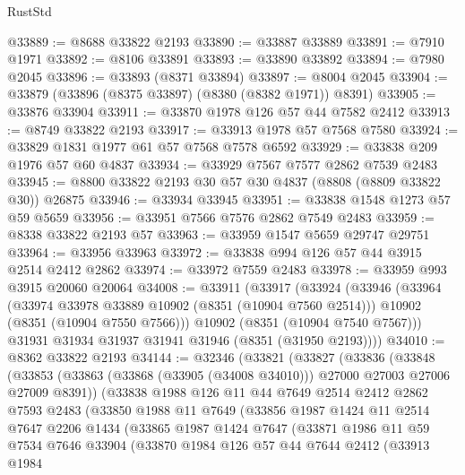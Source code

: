\begin{lexlean}{RustStd}
\begin{coremodule}
@33889 := @8688 @33822 @2193
@33890 := @33887 @33889
@33891 := @7910 @1971
@33892 := @8106 @33891
@33893 := @33890 @33892
@33894 := @7980 @2045
@33896 := @33893 (@8371 @33894)
@33897 := @8004 @2045
@33904 := @33879 (@33896 (@8375 @33897) (@8380 (@8382 @1971)) @8391)
@33905 := @33876 @33904
@33911 := @33870 @1978 @126 @57 @44 @7582 @2412
@33913 := @8749 @33822 @2193
@33917 := @33913 @1978 @57 @7568 @7580
@33924 := @33829 @1831 @1977 @61 @57 @7568 @7578 @6592
@33929 := @33838 @209 @1976 @57 @60 @4837
@33934 := @33929 @7567 @7577 @2862 @7539 @2483
@33945 := @8800 @33822 @2193 @30 @57 @30 @4837 (@8808 (@8809 @33822 @30)) @26875
@33946 := @33934 @33945
@33951 := @33838 @1548 @1273 @57 @59 @5659
@33956 := @33951 @7566 @7576 @2862 @7549 @2483
@33959 := @8338 @33822 @2193 @57
@33963 := @33959 @1547 @5659 @29747 @29751
@33964 := @33956 @33963
@33972 := @33838 @994 @126 @57 @44 @3915 @2514 @2412 @2862
@33974 := @33972 @7559 @2483
@33978 := @33959 @993 @3915 @20060 @20064
@34008 := @33911
    (@33917
      (@33924
        (@33946
          (@33964
            (@33974 @33978 @33889 @10902 (@8351 (@10904 @7560 @2514)))
            @10902
            (@8351 (@10904 @7550 @7566)))
          @10902
          (@8351 (@10904 @7540 @7567)))
        @31931
        @31934
        @31937
        @31941
        @31946
        (@8351 (@31950 @2193))))
@34010 := @8362 @33822 @2193
@34144 := @32346
    (@33821
      (@33827
        (@33836
          (@33848
            (@33853 (@33863 (@33868 (@33905 (@34008 @34010))) @27000 @27003 @27006 @27009 @8391))
            (@33838
              @1988
              @126
              @11
              @44
              @7649
              @2514
              @2412
              @2862
              @7593
              @2483
              (@33850
                @1988
                @11
                @7649
                (@33856
                  @1987
                  @1424
                  @11
                  @2514
                  @7647
                  @2206
                  @1434
                  (@33865
                    @1987
                    @1424
                    @7647
                    (@33871
                      @1986
                      @11
                      @59
                      @7534
                      @7646
                      @33904
                      (@33870
                        @1984
                        @126
                        @57
                        @44
                        @7644
                        @2412
                        (@33913
                          @1984

\end{coremodule}
\end{lexlean}
